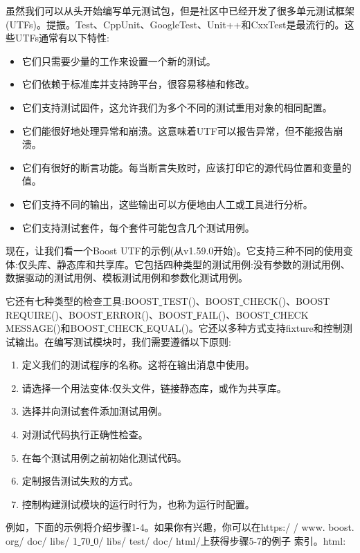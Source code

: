 虽然我们可以从头开始编写单元测试包，但是社区中已经开发了很多单元测试框架(UTFs)。提振。Test、CppUnit、GoogleTest、Unit++和CxxTest是最流行的。这些UTFs通常有以下特性:\par

\begin{itemize}
	\item 它们只需要少量的工作来设置一个新的测试。
	\item 它们依赖于标准库并支持跨平台，很容易移植和修改。
	\item 它们支持测试固件，这允许我们为多个不同的测试重用对象的相同配置。
	\item 它们能很好地处理异常和崩溃。这意味着UTF可以报告异常，但不能报告崩溃。
	\item 它们有很好的断言功能。每当断言失败时，应该打印它的源代码位置和变量的值。
	\item 它们支持不同的输出，这些输出可以方便地由人工或工具进行分析。
	\item 它们支持测试套件，每个套件可能包含几个测试用例。
\end{itemize}

现在，让我们看一个Boost UTF的示例(从v1.59.0开始)。它支持三种不同的使用变体:仅头库、静态库和共享库。它包括四种类型的测试用例:没有参数的测试用例、数据驱动的测试用例、模板测试用例和参数化测试用例。 \par
它还有七种类型的检查工具:BOOST\underline{ }TEST()、BOOST\underline{ }CHECK()、BOOST\underline{ }REQUIRE()、BOOST\underline{ }ERROR()、BOOST\underline{ }FAIL()、BOOST\underline{ }CHECK\underline{ }MESSAGE()和BOOST\underline{ }CHECK\underline{ }EQUAL()。它还以多种方式支持fixture和控制测试输出。在编写测试模块时，我们需要遵循以下原则: \par

\begin{enumerate}
	\item 定义我们的测试程序的名称。这将在输出消息中使用。 
	\item 请选择一个用法变体:仅头文件，链接静态库，或作为共享库。 
	\item 选择并向测试套件添加测试用例。  
	\item 对测试代码执行正确性检查。
	\item 在每个测试用例之前初始化测试代码。 
	\item 定制报告测试失败的方式。
	\item 控制构建测试模块的运行时行为，也称为运行时配置。
\end{enumerate}

例如，下面的示例将介绍步骤1-4。如果你有兴趣，你可以在https:/ / www. boost. org/ doc/ libs/ 1\underline{ } 70\underline{ } 0/ libs/ test/ doc/ html/上获得步骤5-7的例子
索引。html: \par

